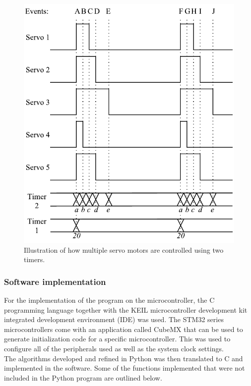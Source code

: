 \begin{figure}[H]
\centering
\includegraphics[scale = 1]{pics/Servo2.pdf}
\caption{Illustration of how multiple servo motors are controlled using two timers.}
\label{fig:Servo2}
\end{figure}

\subsubsection{Software implementation}
For the implementation of the program on the microcontroller, the C programming language together with the KEIL microcontroller development kit integrated development environment (IDE) was used. The STM32 series microcontrollers come with an application called CubeMX that can be used to generate initialization code for a specific microcontroller. This was used to configure all of the peripherals used as well as the system clock settings.\\

The algorithms developed and refined in Python was then translated to C and implemented in the software. Some of the functions implemented that were not included in the Python program are outlined below.\\


